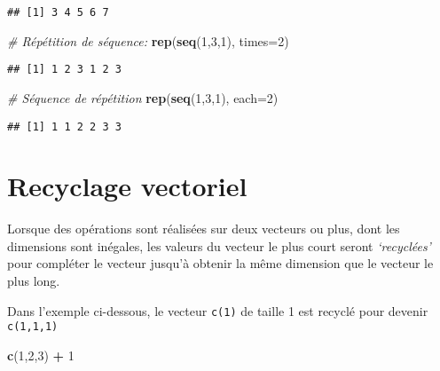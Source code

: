 \documentclass[]{book}
\newenvironment{Shaded}{\begin{snugshade}}{\end{snugshade}}
\newcommand{\CommentTok}[1]{\textcolor[rgb]{0.56,0.35,0.01}{\textit{#1}}}
\newcommand{\DataTypeTok}[1]{\textcolor[rgb]{0.13,0.29,0.53}{#1}}
\newcommand{\DecValTok}[1]{\textcolor[rgb]{0.00,0.00,0.81}{#1}}
\newcommand{\KeywordTok}[1]{\textcolor[rgb]{0.13,0.29,0.53}{\textbf{#1}}}
\newcommand{\NormalTok}[1]{#1}
\newcommand{\OperatorTok}[1]{\textcolor[rgb]{0.81,0.36,0.00}{\textbf{#1}}}
\newcommand{\StringTok}[1]{\textcolor[rgb]{0.31,0.60,0.02}{#1}}
\begin{document}
\begin{verbatim}
## [1] 3 4 5 6 7
\end{verbatim}

\begin{Shaded}
\begin{Highlighting}[]
\CommentTok{# Répétition de séquence:}
\KeywordTok{rep}\NormalTok{(}\KeywordTok{seq}\NormalTok{(}\DecValTok{1}\NormalTok{,}\DecValTok{3}\NormalTok{,}\DecValTok{1}\NormalTok{), }\DataTypeTok{times=}\DecValTok{2}\NormalTok{)}
\end{Highlighting}
\end{Shaded}

\begin{verbatim}
## [1] 1 2 3 1 2 3
\end{verbatim}

\begin{Shaded}
\begin{Highlighting}[]
\CommentTok{# Séquence de répétition}
\KeywordTok{rep}\NormalTok{(}\KeywordTok{seq}\NormalTok{(}\DecValTok{1}\NormalTok{,}\DecValTok{3}\NormalTok{,}\DecValTok{1}\NormalTok{), }\DataTypeTok{each=}\DecValTok{2}\NormalTok{)}
\end{Highlighting}
\end{Shaded}

\begin{verbatim}
## [1] 1 1 2 2 3 3
\end{verbatim}

\hypertarget{recyclage-vectoriel-1}{%
\section{Recyclage vectoriel}\label{recyclage-vectoriel-1}}

Lorsque des opérations sont réalisées sur deux vecteurs ou plus, dont les dimensions sont inégales, les valeurs du vecteur le plus court seront \emph{`recyclées'} pour compléter le vecteur jusqu'à obtenir la même dimension que le vecteur le plus long.

Dans l'exemple ci-dessous, le vecteur \texttt{c(1)} de taille 1 est recyclé pour devenir \texttt{c(1,1,1)}

\begin{Shaded}
\begin{Highlighting}[]
\KeywordTok{c}\NormalTok{(}\DecValTok{1}\NormalTok{,}\DecValTok{2}\NormalTok{,}\DecValTok{3}\NormalTok{) }\OperatorTok{+}\StringTok{ }\DecValTok{1}
\end{Highlighting}
\end{Shaded}
\end{document}
